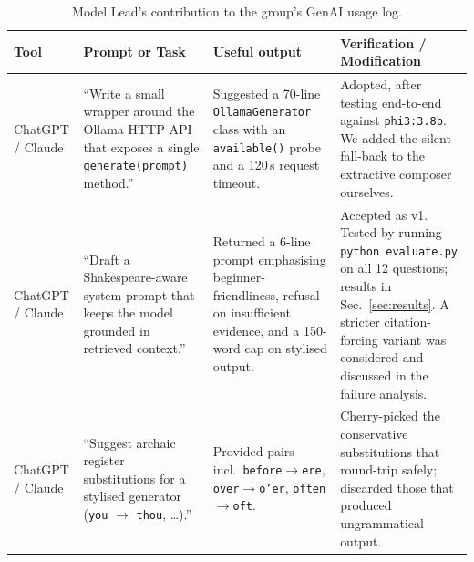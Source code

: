 \documentclass[10pt,twocolumn,a4paper]{article}
\begin{document}
\begin{table}[h]
\centering
\caption{Model Lead's contribution to the group's GenAI usage log.}
\begin{tabularx}{\textwidth}{p{2.2cm} p{3.4cm} p{3.4cm} X}
\toprule
Tool & Prompt or Task & Useful output & Verification / Modification \\
\midrule
ChatGPT / Claude
& ``Write a small wrapper around the Ollama HTTP API that exposes a single \texttt{generate(prompt)} method.''
& Suggested a 70-line \texttt{OllamaGenerator} class with an \texttt{available()} probe and a 120\,s request timeout.
& Adopted, after testing end-to-end against \texttt{phi3:3.8b}. We added the silent fall-back to the extractive composer ourselves. \\
\midrule
ChatGPT / Claude
& ``Draft a Shakespeare-aware system prompt that keeps the model grounded in retrieved context.''
& Returned a 6-line prompt emphasising beginner-friendliness, refusal on insufficient evidence, and a 150-word cap on stylised output.
& Accepted as v1. Tested by running \texttt{python evaluate.py} on all 12 questions; results in Sec.~\ref{sec:results}. A stricter citation-forcing variant was considered and discussed in the failure analysis. \\
\midrule
ChatGPT / Claude
& ``Suggest archaic register substitutions for a stylised generator (\texttt{you} $\to$ \texttt{thou}, \ldots).''
& Provided pairs incl.\ \texttt{before}$\to$\texttt{ere}, \texttt{over}$\to$\texttt{o'er}, \texttt{often}$\to$\texttt{oft}.
& Cherry-picked the conservative substitutions that round-trip safely; discarded those that produced ungrammatical output. \\
\bottomrule
\end{tabularx}
\end{table}
\end{document}
